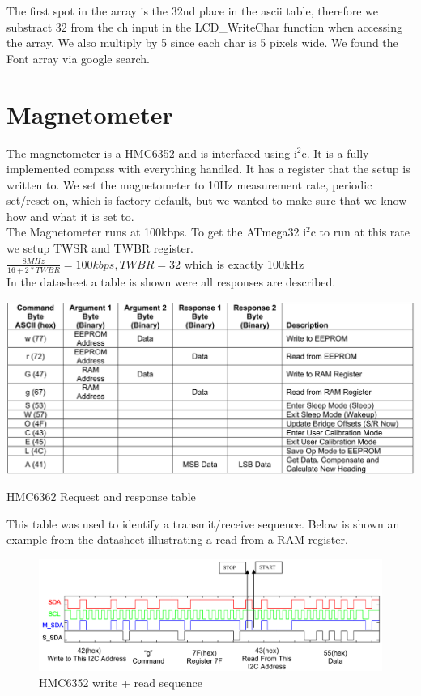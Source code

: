 The first spot in the array is the 32nd place in the ascii table, therefore we substract 32 from the ch input in the LCD\_WriteChar function when accessing the array. We also multiply by 5 since each char is 5 pixels wide. We found the Font array via google search.

\section{Magnetometer}
The magnetometer is a HMC6352 and is interfaced using i$^2$c. It is a fully implemented compass with everything handled. It has a register that  the setup is written to. We set the magnetometer to 10Hz measurement rate, periodic set/reset on, which is factory default, but we wanted to make sure that we know how and what it is set to.\\
The Magnetometer runs at 100kbps. To get the ATmega32 i$^2$c to run at this rate we setup TWSR and TWBR register.\\
$\frac{8MHz}{16+2*TWBR}=100kbps, TWBR = 32$ which is exactly 100kHz\\
In the datasheet a table is shown were all responses are described.

\begin{table}[H]
\centering
\includegraphics[width=.9\textwidth]{billeder/HMC6352_responses}
\caption{HMC6362 Request and response table}
\end{table}

This table was used to identify a transmit/receive sequence. Below is shown an example from the datasheet illustrating a read from a RAM register.

\begin{figure}[H]
\centering
\includegraphics[width=.8\textwidth]{billeder/HMC6352_example}
\caption{HMC6352 write + read sequence}
\end{figure}


